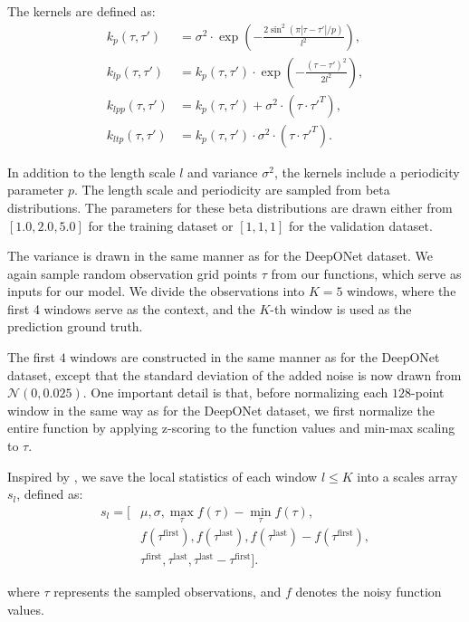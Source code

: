 \documentclass{article}
\theoremstyle{plain}
\theoremstyle{definition}
\theoremstyle{remark}
\begin{document}
The kernels are defined as:
\begin{align*}
    k_p(\tau, \tau') &= \sigma^2 \cdot \exp\left(-\frac{2\sin^2\left(\pi |\tau - \tau'| / p\right)}{l^2}\right), \\
    k_{lp}(\tau, \tau') &= k_p(\tau, \tau') \cdot \exp\left(-\frac{(\tau - \tau')^2}{2l^2}\right), \\
    k_{lpp}(\tau, \tau') &= k_p(\tau, \tau') + \sigma^2 \cdot (\tau \cdot \tau'^T), \\
    k_{ltp}(\tau, \tau') &= k_p(\tau, \tau') \cdot \sigma^2 \cdot (\tau \cdot \tau'^T).
\end{align*}

In addition to the length scale \(l\) and variance \(\sigma^2\), the kernels include a periodicity parameter \(p\). The length scale and periodicity are sampled from beta distributions. The parameters for these beta distributions are drawn either from \([1.0, 2.0, 5.0]\) for the training dataset or \([1, 1, 1]\) for the validation dataset.

The variance is drawn in the same manner as for the DeepONet dataset. We again sample random observation grid points \(\tau\) from our functions, which serve as inputs for our model. We divide the observations into \(K=5\) windows, where the first 4 windows serve as the context, and the \(K\)-th window is used as the prediction ground truth.

The first \(4\) windows are constructed in the same manner as for the DeepONet dataset, except that the standard deviation of the added noise is now drawn from \(\mathcal{N}(0, 0.025)\). One important detail is that, before normalizing each \(128\)-point window in the same way as for the DeepONet dataset, we first normalize the entire function by applying z-scoring to the function values and min-max scaling to \(\tau\).

Inspired by \cite{fim-l}, we save the local statistics of each window $l\leq K$ into a scales array \(s_l\), defined as:
\[
\begin{aligned}
s_l = [&\mu, \sigma, \max_{\tau} f(\tau) - \min_{\tau} f(\tau), \\
       &f(\tau^{\text{first}}), f(\tau^{\text{last}}), 
        f(\tau^{\text{last}}) - f(\tau^{\text{first}}), \\
       &\tau^{\text{first}}, \tau^{\text{last}}, 
        \tau^{\text{last}} - \tau^{\text{first}}].
\end{aligned}
\]


where \(\tau\) represents the sampled observations, and \(f\) denotes the noisy function values.
\end{document}
